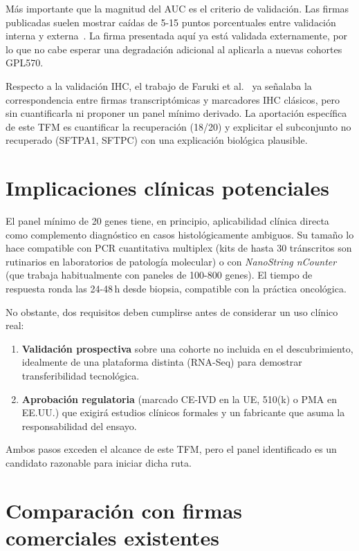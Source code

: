 Más importante que la magnitud del AUC es el criterio de validación. Las
firmas publicadas suelen mostrar caídas de 5-15 puntos porcentuales entre
validación interna y externa~\cite{bernau2014crossvalidation}. La firma
presentada aquí ya está validada externamente, por lo que no cabe
esperar una degradación adicional al aplicarla a nuevas cohortes GPL570.

Respecto a la validación IHC, el trabajo de Faruki et
al.~\cite{faruki2017lung} ya señalaba la correspondencia entre firmas
transcriptómicas y marcadores IHC clásicos, pero sin cuantificarla ni
proponer un panel mínimo derivado. La aportación específica de este TFM
es cuantificar la recuperación (18/20) y explicitar el subconjunto no
recuperado (SFTPA1, SFTPC) con una explicación biológica plausible.

\section{Implicaciones clínicas potenciales}
\label{sec:disc_clinico}

El panel mínimo de 20 genes tiene, en principio, aplicabilidad clínica
directa como complemento diagnóstico en casos histológicamente ambiguos.
Su tamaño lo hace compatible con PCR cuantitativa multiplex (kits de hasta
30 tránscritos son rutinarios en laboratorios de patología molecular) o
con \emph{NanoString nCounter} (que trabaja habitualmente con paneles de
100-800 genes). El tiempo de respuesta ronda las 24-48\,h desde biopsia,
compatible con la práctica oncológica.

No obstante, dos requisitos deben cumplirse antes de considerar un uso
clínico real:

\begin{enumerate}
  \item \textbf{Validación prospectiva} sobre una cohorte no incluida en
  el descubrimiento, idealmente de una plataforma distinta (RNA-Seq) para
  demostrar transferibilidad tecnológica.
  \item \textbf{Aprobación regulatoria} (marcado CE-IVD en la UE, 510(k)
  o PMA en EE.UU.) que exigirá estudios clínicos formales y un
  fabricante que asuma la responsabilidad del ensayo.
\end{enumerate}

Ambos pasos exceden el alcance de este TFM, pero el panel identificado es
un candidato razonable para iniciar dicha ruta.

\section{Comparación con firmas comerciales existentes}
\label{sec:disc_comerciales}

